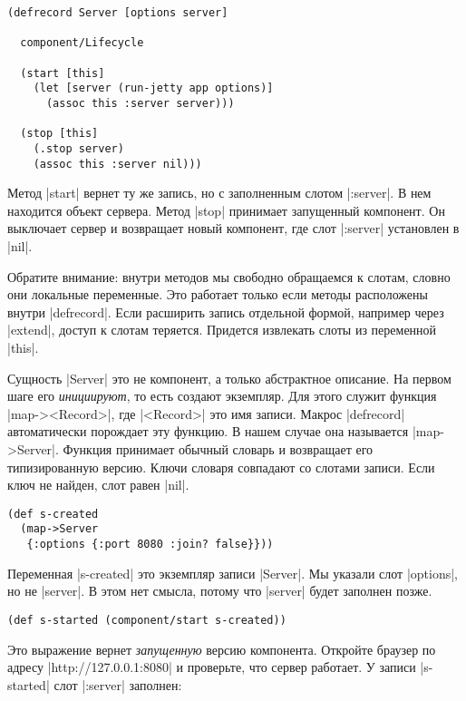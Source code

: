\begin{verbatim}
(defrecord Server [options server]

  component/Lifecycle

  (start [this]
    (let [server (run-jetty app options)]
      (assoc this :server server)))

  (stop [this]
    (.stop server)
    (assoc this :server nil)))
\end{verbatim}

Метод \spverb|start| вернет ту же запись, но с заполненным слотом
\spverb|:server|. В нем находится объект сервера. Метод \spverb|stop| принимает
запущенный компонент. Он выключает сервер и возвращает новый компонент, где слот
\spverb|:server| установлен в \spverb|nil|.

Обратите внимание: внутри методов мы свободно обращаемся к слотам, словно они
локальные переменные. Это работает только если методы расположены внутри
\spverb|defrecord|. Если расширить запись отдельной формой, например через
\spverb|extend|, доступ к слотам теряется. Придется извлекать слоты из
переменной \spverb|this|.

Сущность \spverb|Server| это не компонент, а только абстрактное описание. На
первом шаге его \emph{инициируют}, то есть создают экземпляр. Для этого служит
функция \spverb|map-><Record>|, где \spverb|<Record>| это имя записи. Макрос
\spverb|defrecord| автоматически порождает эту функцию. В нашем случае она
называется \spverb|map->Server|. Функция принимает обычный словарь и возвращает
его типизированную версию. Ключи словаря совпадают со слотами записи. Если ключ
не найден, слот равен \spverb|nil|.

\begin{verbatim}
(def s-created
  (map->Server
   {:options {:port 8080 :join? false}}))
\end{verbatim}

Переменная \spverb|s-created| это экземпляр записи \spverb|Server|. Мы указали
слот \spverb|options|, но не \spverb|server|. В этом нет смысла, потому что
\spverb|server| будет заполнен позже.

\begin{verbatim}
(def s-started (component/start s-created))
\end{verbatim}

Это выражение вернет \emph{запущенную} версию компонента. Откройте браузер по
адресу \spverb|http://127.0.0.1:8080| и проверьте, что сервер работает. У записи
\spverb|s-started| слот \spverb|:server| заполнен:

